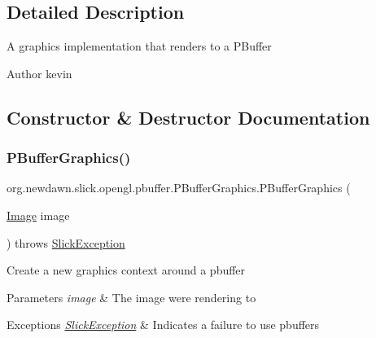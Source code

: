 \subsection{Detailed Description}
A graphics implementation that renders to a P\+Buffer

\begin{DoxyAuthor}{Author}
kevin 
\end{DoxyAuthor}


\subsection{Constructor \& Destructor Documentation}
\mbox{\label{classorg_1_1newdawn_1_1slick_1_1opengl_1_1pbuffer_1_1_p_buffer_graphics_a2fc71983514395eef320ca681dc605f9}} 
\subsubsection{\texorpdfstring{P\+Buffer\+Graphics()}{PBufferGraphics()}}
{\footnotesize\ttfamily org.\+newdawn.\+slick.\+opengl.\+pbuffer.\+P\+Buffer\+Graphics.\+P\+Buffer\+Graphics (\begin{DoxyParamCaption}\item[{\mbox{\hyperlink{classorg_1_1newdawn_1_1slick_1_1_image}{Image}}}]{image }\end{DoxyParamCaption}) throws \mbox{\hyperlink{classorg_1_1newdawn_1_1slick_1_1_slick_exception}{Slick\+Exception}}\hspace{0.3cm}{\ttfamily [inline]}}

Create a new graphics context around a pbuffer


\begin{DoxyParams}{Parameters}
{\em image} & The image we\textquotesingle{}re rendering to \\
\hline
\end{DoxyParams}

\begin{DoxyExceptions}{Exceptions}
{\em \mbox{\hyperlink{classorg_1_1newdawn_1_1slick_1_1_slick_exception}{Slick\+Exception}}} & Indicates a failure to use pbuffers \\
\hline
\end{DoxyExceptions}

